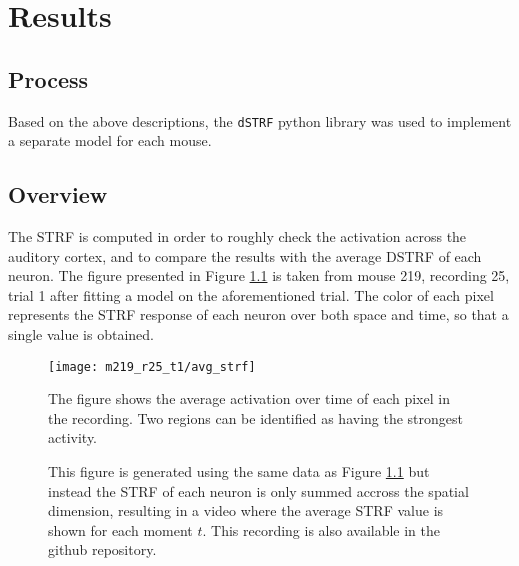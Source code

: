\chapter{Results}\label{results}

\section{Process}
Based on the above descriptions, the \verb|dSTRF| python library was used to implement a separate model for each mouse. 

\section{Overview}

The STRF is computed in order to roughly check the activation across the auditory cortex, and to compare the results with the average DSTRF of each neuron. The figure presented in Figure \ref{fig:strf_m219_r25} is taken from mouse 219, recording 25, trial 1 after fitting a  model on the aforementioned trial. The color of each pixel represents the STRF response of each neuron over both space and time, so that a single value is obtained.

\begin{figure}[ht]
	\centering
	\texttt{[image: m219\_r25\_t1/avg\_strf]}
	\caption{The figure shows the average activation over time of each pixel in the recording. Two regions can be identified as having the strongest activity.}
	\label{fig:strf_m219_r25}
\end{figure}

\begin{figure}
\centering
{}
\caption{This figure is generated using the same data as Figure \ref{fig:strf_m219_r25} but instead the STRF of each neuron is only summed accross the spatial dimension, resulting in a video where the average STRF value is shown for each moment $t$. This recording is also available in the github repository.}
\end{figure}


